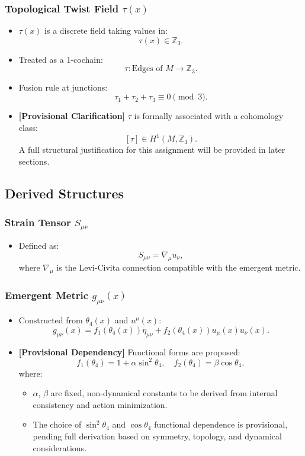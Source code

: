 \documentclass[12pt]{article}
\begin{document}
\subsubsection{Topological Twist Field \( \tau(x) \)}
\begin{itemize}
    \item \( \tau(x) \) is a discrete field taking values in:
    \[
    \tau(x) \in \mathbb{Z}_3.
    \]
    \item Treated as a 1-cochain:
    \[
    \tau: \text{Edges of } M \to \mathbb{Z}_3.
    \]
    \item Fusion rule at junctions:
    \[
    \tau_1 + \tau_2 + \tau_3 \equiv 0 \pmod{3}.
    \]
    \item \textbf{[Provisional Clarification]} \( \tau \) is formally associated with a cohomology class:
    \[
    [\tau] \in H^1(M, \mathbb{Z}_3).
    \]
    A full structural justification for this assignment will be provided in later sections.
\end{itemize}

\subsection{Derived Structures}

\subsubsection{Strain Tensor \( S_{\mu\nu} \)}
\begin{itemize}
    \item Defined as:
    \[
    S_{\mu\nu} = \nabla_\mu u_\nu,
    \]
    where \( \nabla_\mu \) is the Levi-Civita connection compatible with the emergent metric.
\end{itemize}

\subsubsection{Emergent Metric \( g_{\mu\nu}(x) \)}
\begin{itemize}
    \item Constructed from \( \theta_4(x) \) and \( u^\mu(x) \):
    \[
    g_{\mu\nu}(x) = f_1(\theta_4(x)) \eta_{\mu\nu} + f_2(\theta_4(x)) u_\mu(x) u_\nu(x).
    \]
    \item \textbf{[Provisional Dependency]} Functional forms are proposed:
    \[
    f_1(\theta_4) = 1 + \alpha \sin^2 \theta_4, \quad f_2(\theta_4) = \beta \cos \theta_4,
    \]
    where:
    \begin{itemize}
        \item \( \alpha \), \( \beta \) are fixed, non-dynamical constants to be derived from internal consistency and action minimization.
        \item The choice of \( \sin^2 \theta_4 \) and \( \cos \theta_4 \) functional dependence is provisional, pending full derivation based on symmetry, topology, and dynamical considerations.
    \end{itemize}
\end{itemize}
\end{document}

